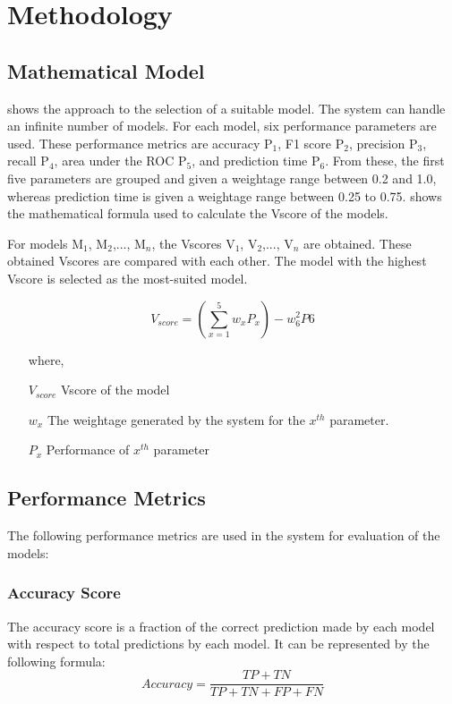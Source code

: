 \documentclass[a4paper,fleqn]{cas-dc}
\begin{document}
\FloatBarrier
\section{Methodology} \label{sec:methodology}

\subsection{Mathematical Model}\label{subsec:mathematical_model}

 shows the approach to the selection of a suitable model. The system can handle an infinite number of models. For each model, six performance parameters are used. These performance metrics are accuracy P$_1$, F1 score P$_2$, precision P$_3$, recall P$_4$, area under the ROC P$_5$, and prediction time P$_6$. From these, the first five parameters are grouped and given a weightage range between 0.2 and 1.0, whereas prediction time is given a weightage range between 0.25 to 0.75.  shows the mathematical formula used to calculate the Vscore of the models.

For models M$_1$, M$_2$,..., M$_n$, the Vscores V$_1$, V$_2$,..., V$_n$ are obtained. These obtained Vscores are compared with each other. The model with the highest Vscore is selected as the most-suited model.

\begin{equation}\label{eq:v_score}
    V_{score} = \left(\sum_{x=1}^{5} w_xP_x\right) - w_6^2P6
\end{equation}

\begin{itemize}
    \item[where,]
    \item[$V_{score}$] Vscore of the model
    \item[$w_x$] The weightage generated by the system for the $x^{th}$ parameter.
    \item[$P_x$] Performance of $x^{th}$ parameter
\end{itemize}

\subsection{Performance Metrics} \label{subsec:performance_metrics}
The following performance metrics are used in the system for evaluation of the models:

\subsubsection{Accuracy Score}\label{subsubsec:accuracy_score}
The accuracy score is a fraction of the correct prediction made by each model with respect to total predictions by each model. It can be represented by the following formula:
\begin{equation*}\label{eq:accuracy_score}
    Accuracy = \frac{TP+TN}{TP+TN+FP+FN}
\end{equation*}
\end{document}
